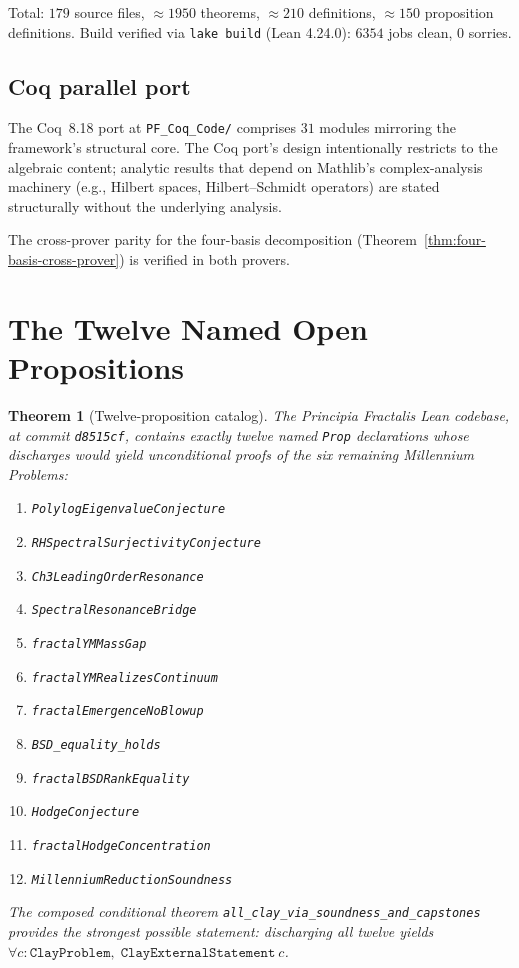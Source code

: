 \documentclass[11pt,a4paper]{article}
\newtheorem{theorem}{Theorem}[section]
\theoremstyle{definition}
\begin{document}
Total: $179$ source files, $\approx 1950$ theorems, $\approx 210$
definitions, $\approx 150$ proposition definitions. Build verified via
\texttt{lake build} (Lean 4.24.0): $6354$ jobs clean, $0$ sorries.

\subsection{Coq parallel port}

The Coq~8.18 port at \texttt{PF\_Coq\_Code/} comprises $31$ modules
mirroring the framework's structural core. The Coq port's design
intentionally restricts to the algebraic content; analytic results
that depend on Mathlib's complex-analysis machinery (e.g., Hilbert
spaces, Hilbert--Schmidt operators) are stated structurally without
the underlying analysis.

The cross-prover parity for the four-basis decomposition
(Theorem~\ref{thm:four-basis-cross-prover}) is verified
in both provers.

\section{The Twelve Named Open Propositions}

\begin{theorem}[Twelve-proposition catalog]\label{thm:twelve-props-cat}
The Principia Fractalis Lean codebase, at commit \texttt{d8515cf},
contains exactly twelve named \texttt{Prop} declarations whose
discharges would yield unconditional proofs of the six remaining
Millennium Problems:
\begin{enumerate}\itemsep0pt
\item \texttt{PolylogEigenvalueConjecture}
\item \texttt{RHSpectralSurjectivityConjecture}
\item \texttt{Ch3LeadingOrderResonance}
\item \texttt{SpectralResonanceBridge}
\item \texttt{fractalYMMassGap}
\item \texttt{fractalYMRealizesContinuum}
\item \texttt{fractalEmergenceNoBlowup}
\item \texttt{BSD\_equality\_holds}
\item \texttt{fractalBSDRankEquality}
\item \texttt{HodgeConjecture}
\item \texttt{fractalHodgeConcentration}
\item \texttt{MillenniumReductionSoundness}
\end{enumerate}
The composed conditional theorem
\texttt{all\_clay\_via\_soundness\_and\_capstones} provides the
strongest possible statement: discharging all twelve yields
\texttt{$\forall c\colon \mathtt{ClayProblem},\; \mathtt{ClayExternalStatement}\ c$}.
\end{theorem}
\end{document}
